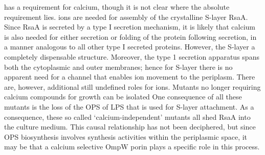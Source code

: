\caulobacter has a requirement for calcium, though it is not clear where the absolute requirement lies.  ions are needed for assembly of the crystalline \ac{S-layer} RsaA. Since RsaA is secreted by a type I secretion mechanism, it is likely that calcium is also needed for either secretion or folding of the protein following secretion, in a manner analogous to all other type I secreted proteins.  However, the \ac{S-layer} a completely dispensable structure. Moreover, the type 1 secretion apparatus spans both the cytoplasmic and outer membranes; hence for \ac{S-layer} there is no apparent need for a channel that enables  ion movement to the periplasm. There are, however, additional still undefined roles for  ions. Mutants no longer requiring calcium compounds for growth can be isolated One consequence of all these mutants is the loss of the \ac{OPS} of \ac{LPS} that is used for \ac{S-layer} attachment. As a consequence, these so called `calcium-independent' mutants all shed RsaA into the culture medium. This causal relationship has not been deciphered, but since \ac{OPS} biosynthesis involves synthesis activities within the periplasmic space, it may be that a calcium selective OmpW porin plays a specific role in this process. 

